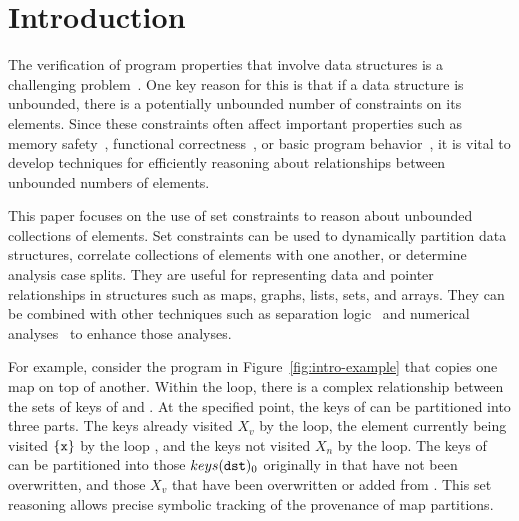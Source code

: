 \section{Introduction}
\label{s:1:intro}
The verification of program properties that
involve data structures is a challenging problem~\cite{jahob:thesis:07,compass:popl:11,fixbag:cav:11,celia:vmcai:12,ab:ecoop:13,hoo:14:sas,memcad:15:sas}.
One key reason for this is that
if a data structure is unbounded, there is a potentially unbounded number of constraints on its elements.  Since these constraints often affect important properties such as memory safety~\cite{memcad:15:sas}, functional correctness~\cite{fixbag:cav:11}, or basic program behavior~\cite{hoo:14:sas}, it is vital to develop techniques for efficiently reasoning about relationships between unbounded numbers of elements.

This paper focuses on the use of set constraints to reason about unbounded collections of elements.  Set constraints can be used to dynamically partition data structures, correlate collections of elements with one another, or determine analysis case splits.  They are useful for representing data and pointer relationships in structures such as maps, graphs, lists, sets, and arrays.  They can be combined with other techniques such as separation logic~\cite{hoo:14:sas,memcad:15:sas} and numerical analyses~\cite{quicr:cav:14} to enhance those analyses.

For example, consider the program in Figure~\ref{fig:intro-example}
that copies one map on top of another.
Within the loop, there is a complex relationship between the sets of
keys of  and .
At the specified point, the keys of  can be partitioned into
three parts.
The keys already visited $X_v$ by the loop, the element currently being
visited $\{\texttt{x}\}$ by the loop , and the keys not visited $X_n$ by
the loop.
The keys of  can be partitioned into those $keys(\texttt{dst})_0$ originally in
 that have not been overwritten, and those $X_v$ that have
been overwritten or added from .
This set reasoning allows precise symbolic tracking of the provenance
of map partitions.

